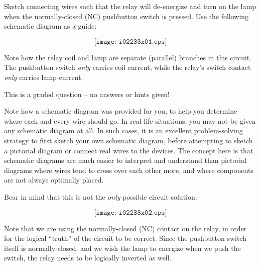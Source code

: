 

Sketch connecting wires such that the relay will de-energize and turn on the lamp when the normally-closed (NC) pushbutton switch is pressed.  Use the following schematic diagram as a guide:

$$\texttt{[image: i02233x01.eps]}$$

Note how the relay coil and lamp are separate (parallel) branches in this circuit.  The pushbutton switch {\it only} carries coil current, while the relay's switch contact {\it only} carries lamp current.

\vfil 

\eject






This is a graded question -- no answers or hints given!







Note how a schematic diagram was provided for you, to help you determine where each and every wire should go.  In real-life situations, you may not be given any schematic diagram at all.  In such cases, it is an excellent problem-solving strategy to first sketch your own schematic diagram, before attempting to sketch a pictorial diagram or connect real wires to the devices.  The concept here is that schematic diagrams are much easier to interpret and understand than pictorial diagrams where wires tend to cross over each other more, and where components are not always optimally placed.

\vskip 10pt

Bear in mind that this is not the {\it only} possible circuit solution:

$$\texttt{[image: i02233x02.eps]}$$

Note that we are using the normally-closed (NC) contact on the relay, in order for the logical ``truth'' of the circuit to be correct.  Since the pushbutton switch itself is normally-closed, and we wish the lamp to energize when we push the switch, the relay needs to be logically inverted as well.




